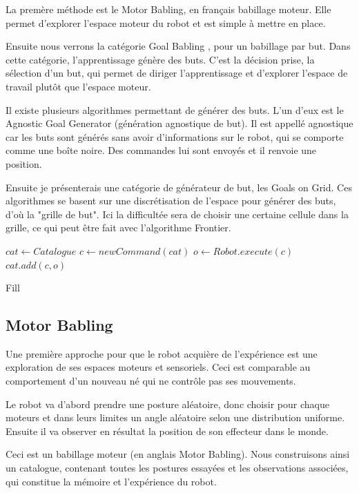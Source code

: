\documentclass[11pt,french]{report}
\begin{document}
La premère méthode est le Motor Babling, en français babillage moteur.
Elle permet d'explorer l'espace moteur du robot et est simple à mettre en place.

\phantom{INVISIBLE LINE}

Ensuite nous verrons la catégorie Goal Babling \cite{GoalBabling}, pour un babillage par but.
Dans cette catégorie, l'apprentissage génère des buts.
C'est la décision prise, la sélection d'un but, qui permet de diriger l'apprentissage et d'explorer l'espace de travail plutôt que l'espace moteur.

Il existe plusieurs algorithmes permettant de générer des buts.
L'un d'eux est le Agnostic Goal Generator (génération agnostique de but).
Il est appellé agnostique car les buts sont générés sans avoir d'informations sur le robot, qui se comporte comme une boîte noire.
Des commandes lui sont envoyés et il renvoie une position.

Ensuite je présenterais une catégorie de générateur de but, les Goals on Grid.
Ces algorithmes se basent sur une discrétisation de l'espace pour générer des buts, d'où la "grille de but".
Ici la difficultée sera de choisir une certaine cellule dans la grille, ce qui peut être fait avec l'algorithme Frontier.

\begin{algorithm}[h]
    \DontPrintSemicolon
    \LinesNumbered
    $cat \leftarrow Catalogue$\;
     {
        $c \leftarrow newCommand(cat)$ \;
        $o \leftarrow Robot.execute(c)$\;
        $cat.add(c, o)$ \;
    }
    \caption{\label{alg:Fill} Fill}
\end{algorithm}

\subsection{Motor Babling}

Une première approche pour que le robot acquière de l'expérience est une exploration de ses espaces moteurs et sensoriels.
Ceci est comparable au comportement d'un nouveau né qui ne contrôle pas ses mouvements.

\phantom{INVISIBLE LINE}

Le robot va d'abord prendre une posture aléatoire, donc choisir pour chaque moteurs et dans leurs limites un angle aléatoire selon une distribution uniforme.
Ensuite il va observer en résultat la position de son effecteur dans le monde.

Ceci est un babillage moteur (en anglais Motor Babling).
Nous construisons ainsi un catalogue, contenant toutes les postures essayées et les observations associées, qui constitue la mémoire et l'expérience du robot.
\end{document}
